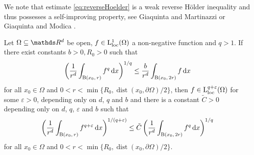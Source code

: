   We note that estimate \eqref{eq:reverseHoelder} is a weak reverse H\"older inequality and thus possesses a self-improving property, see Giaquinta and Martinazzi \cite[Thm.\@~6.38]{giaquintaMartinazzi} or Giaquinta and Modica \cite[Prop.\@~5.1]{giaquintaModica}.

  \begin{prop}
    \label{prop:giaquinta}
    Let $\Omega \subseteq \R^d$ be open, $f \in \mathrm{L}^1_{\mathrm{loc}}(\Omega)$ a non-negative function and $q > 1$.
    If there exist constants $b > 0, R_0 > 0$ such that
    \begin{align*}
      \bigg( \frac{1}{r^d} \int_{\mathrm{B}(x_0,\, r)} f^q \, {\operatorname{d}\!{x}} \bigg)^{1/q} \leq \frac{b}{r^d} \int_{\mathrm{B}(x_0,\, 2r)} f \, {\operatorname{d}\!{x}}
    \end{align*}
    for all $x_0 \in \Omega$ and $0 < r < \min\big\{ R_0, \operatorname{dist}(x_0, \partial\Omega)/2\big\}$, then $f \in \mathrm{L}^{q + \varepsilon}_{\mathrm{loc}}(\Omega)$ for some $\varepsilon > 0$, depending only on $d$, $q$ and $b$ and there is a constant $\tilde C > 0$ depending only on $d$, $q$, $\varepsilon$ and $b$ such that
    \begin{align*}
      \bigg( \frac{1}{r^d} \int_{\mathrm{B}(x_0,\, r)} f^{q + \varepsilon} \, {\operatorname{d}\!{x}} \bigg)^{1/(q + \varepsilon)} \leq \tilde C \,\bigg( \frac{1}{r^d} \int_{\mathrm{B}(x_0,\, 2r)} f^q \, {\operatorname{d}\!{x}} \bigg)^{1/q}
    \end{align*}
    for all $x_0 \in \Omega$ and $0 < r < \min\{R_0, \operatorname{dist}(x_0, \partial\Omega)/2\}$.
  \end{prop}

